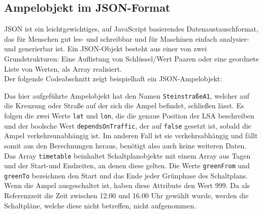 \subsection[Ampelobjekt im JSON-Format]{Ampelobjekt im \gls{JSON}-Format}
\gls{JSON} ist ein leichtgewichtiges, auf JavaScript basierendes Datenaustauschformat, das für Menschen gut les- und schreibbar und für Maschinen einfach analysier- und generierbar ist. Ein \gls{JSON}-Objekt besteht aus einer von zwei Grundstrukturen: Eine Auflistung von Schlüssel/Wert Paaren oder eine geordnete Liste von Werten, als Array realisiert. \cite{json}\\ 
Der folgende Codeabschnitt zeigt beispielhaft ein \gls{JSON}-Ampelobjekt:  
\begin{center}
\grayRule

\grayRule
\end{center}
Das hier aufgeführte Ampelobjekt hat den Namen \texttt{SteinstraßeA1}, welcher auf die Kreuzung oder Straße auf der sich die Ampel befindet, schließen lässt. Es folgen die zwei Werte \texttt{lat} und \texttt{lon}, die die genaue Position der \gls{LSA} beschreiben und der boolsche Wert \texttt{dependsOnTraffic}, der auf \texttt{false} gesetzt ist, sobald die Ampel verkehrsunabhängig ist. Im anderen Fall ist sie verkehrsabhängig und fällt somit aus den Berechnungen heraus, benötigt also auch keine weiteren Daten. Das Array \texttt{timetable} beinhaltet Schaltplanobjekte mit einem Array aus Tagen und der Start-und Endzeiten, an denen diese gelten. Die Werte \texttt{greenFrom} und \texttt{greenTo} bezeichnen den Start und das Ende jeder Grünphase des Schaltplans. Wenn die Ampel ausgeschaltet ist, haben diese Attribute den Wert 999. Da als Referenzzeit die Zeit zwischen 12.00 und 16.00 Uhr gewählt wurde, werden die Schaltpläne, welche diese nicht betreffen, nicht aufgenommen.
